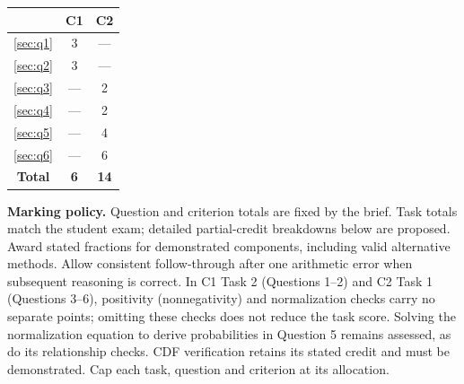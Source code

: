 \begin{center}
\begin{tabular}{|c|c|c|}
	\hline\textbf{\textnumero} & \textbf{C1} & \textbf{C2} \\ \hline
	\ref*{sec:q1} & 3 & --- \\\hline
	\ref*{sec:q2} & 3 & --- \\\hline
	\ref*{sec:q3} & --- & 2 \\\hline
	\ref*{sec:q4} & --- & 2 \\\hline
	\ref*{sec:q5} & --- & 4 \\\hline
	\ref*{sec:q6} & --- & 6 \\\hline
	\textbf{Total} & \textbf{6} & \textbf{14} \\\hline
\end{tabular}
\end{center}

\textbf{Marking policy.} Question and criterion totals are fixed by the brief. Task totals match the student exam; detailed partial-credit breakdowns below are proposed. Award stated fractions for demonstrated components, including valid alternative methods. Allow consistent follow-through after one arithmetic error when subsequent reasoning is correct. In C1 Task 2 (Questions 1--2) and C2 Task 1 (Questions 3--6), positivity (nonnegativity) and normalization checks carry no separate points; omitting these checks does not reduce the task score. Solving the normalization equation to derive probabilities in Question 5 remains assessed, as do its relationship checks. CDF verification retains its stated credit and must be demonstrated. Cap each task, question and criterion at its allocation.


\clearpage
